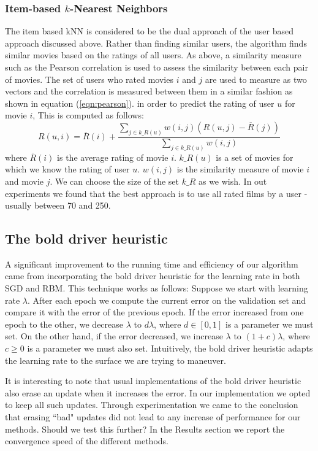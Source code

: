\documentclass[10pt,conference,compsocconf]{IEEEtran}
\begin{document}
\subsubsection*{\textbf{Item-based $k$-Nearest Neighbors}}  The item based kNN is considered to be the dual approach of the user based approach discussed above. Rather than finding similar users, the algorithm finds similar movies based on the ratings of all users. As above, a similarity measure such as the Pearson correlation is used to assess the similarity between each pair of movies. The set of users who rated movies $i$ and $j$ are used to measure as two vectors and the correlation is measured between them in a similar fashion as shown in equation (\ref{eqn:pearson}). in order to predict the rating of user $u$ for movie $i$, This is computed as follows:
\begin{equation}
R(u,i) = \overline{R}(i) + \frac{\sum_{j \in k\_R(u)} w(i,j)(R(u,j) - \overline{R}(j))}{\sum_{j \in k\_R(u)} w(i,j)}
\end{equation}
where $\overline{R}(i)$ is the average rating of movie $i$. $k\_R(u)$ is a set of movies for which we know the rating of user $u$. $w(i,j)$ is the similarity measure of movie $i$ and movie $j$. We can choose the size of the set $k\_R$ as we wish. In out experiments we found that the best approach is to use all rated films by a user - usually between 70 and 250.

\subsection{The bold driver heuristic} 
A significant improvement to the running time and efficiency of our algorithm came from incorporating the bold driver heuristic for the learning rate in both SGD and RBM. This technique works as follows: Suppose we start with learning rate $\lambda$. After each epoch we compute the current error on the validation set and compare it with the error of the previous epoch. If the error increased from one epoch to the other, we decrease $\lambda$ to $d\lambda$, where $d\in[0,1]$ is a parameter we must set. On the other hand, if the error decreased, we increase $\lambda$ to $(1+c)\lambda$, where $c\geq 0$ is a parameter we must also set. Intuitively, the bold driver heuristic adapts the learning rate to the surface we are trying to maneuver.

It is interesting to note that usual implementations of the bold driver heuristic also erase an update when it increases the error. In our implementation we opted to keep all such updates. Through experimentation we came to the conclusion that erasing ``bad" updates did not lead to any increase of performance for our methods. {\color{red} Should we test this further?} In the Results section we report the convergence speed of the different methods.
\end{document}
